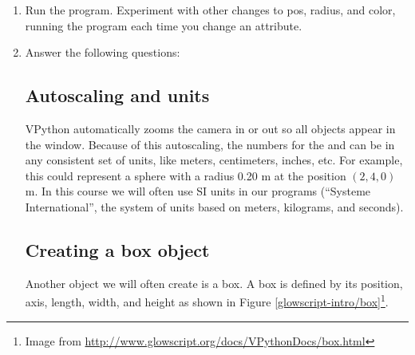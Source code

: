 \begin{enumerate}
	\item Run the program.  Experiment with other changes to pos, radius, and color, running the program each time you change an attribute.
	
	\item Answer the following questions:
	

	\subsection*{Autoscaling and units}

VPython automatically zooms the camera in or out so all objects appear in the window. Because of this autoscaling, the numbers for the  and  can be in any consistent set of units, like meters, centimeters, inches, etc. For example, this could represent a sphere with a radius 0.20 m at the position $(2,4,0)$ m. In this course we will often use SI units in our programs (``Systeme International'', the system of units based on meters, kilograms, and seconds).

	\subsection*{Creating a box object}

Another object we will often create is a box. A box is defined by its position, axis, length, width, and height as shown in Figure \ref{glowscript-intro/box}\footnote{Image from  \url{http://www.glowscript.org/docs/VPythonDocs/box.html}}.


\end{enumerate}
